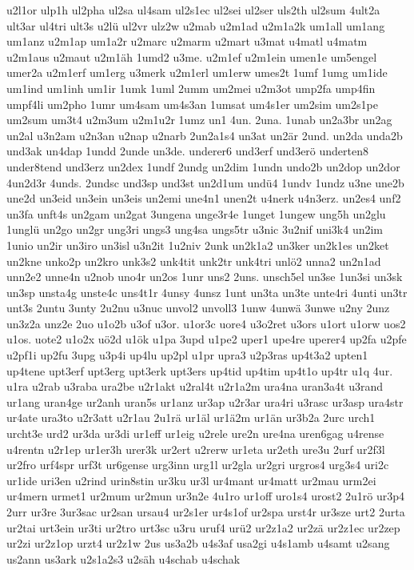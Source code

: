 {u2l1or
ulp1h
ul2pha
ul2sa
ul4sam
ul2s1ec
ul2sei
ul2ser
uls2th
ul2sum
4ult2a
ult3ar
ul4tri
ult3s
u2lü
ul2vr
ulz2w
u2mab
u2m1ad
u2m1a2k
um1all
um1ang
um1anz
u2m1ap
um1a2r
u2marc
u2marm
u2mart
u3mat
u4matl
u4matm
u2m1aus
u2maut
u2m1äh
1umd2
u3me.
u2m1ef
u2m1ein
umen1e
um5engel
umer2a
u2m1erf
um1erg
u3merk
u2m1erl
um1erw
umes2t
1umf
1umg
um1ide
um1ind
um1inh
um1ir
1umk
1uml
2umm
um2mei
u2m3ot
ump2fa
ump4fin
umpf4li
um2pho
1umr
um4sam
um4s3an
1umsat
um4s1er
um2sim
um2s1pe
um2sum
um3t4
u2m3um
u2m1u2r
1umz
un1
4un.
2una.
1unab
un2a3br
un2ag
un2al
u3n2am
u2n3an
u2nap
u2narb
2un2a1s4
un3at
un2är
2und.
un2da
unda2b
und3ak
un4dap
1undd
2unde
un3de.
underer6
und3erf
und3erö
underten8
under8tend
und3erz
un2dex
1undf
2undg
un2dim
1undn
undo2b
un2dop
un2dor
4un2d3r
4unds.
2undsc
und3sp
und3st
un2d1um
undü4
1undv
1undz
u3ne
une2b
une2d
un3eid
un3ein
un3eis
un2emi
une4n1
unen2t
u4nerk
u4n3erz.
un2es4
unf2
un3fa
unft4s
un2gam
un2gat
3ungena
unge3r4e
1unget
1ungew
ung5h
un2glu
1unglü
un2go
un2gr
ung3ri
ungs3
ung4sa
ungs5tr
u3nic
3u2nif
uni3k4
un2im
1unio
un2ir
un3iro
un3isl
u3n2it
1u2niv
2unk
un2k1a2
un3ker
un2k1es
un2ket
un2kne
unko2p
un2kro
unk3s2
unk4tit
unk2tr
unk4tri
unlö2
unna2
un2n1ad
unn2e2
unne4n
u2nob
uno4r
un2os
1unr
uns2
2uns.
unsch5el
un3se
1un3si
un3sk
un3sp
unsta4g
unste4c
uns4t1r
4unsy
4unsz
1unt
un3ta
un3te
unte4ri
4unti
un3tr
unt3s
2untu
3unty
2u2nu
u3nuc
unvol2
unvoll3
1unw
4unwä
3unwe
u2ny
2unz
un3z2a
unz2e
2uo
u1o2b
u3of
u3or.
u1or3c
uore4
u3o2ret
u3ors
u1ort
u1orw
uos2
u1os.
uote2
u1o2x
uö2d
u1ök
u1pa
3upd
u1pe2
uper1
upe4re
uperer4
up2fa
u2pfe
u2pf1i
up2fu
3upg
u3p4i
up4lu
up2pl
u1pr
upra3
u2p3ras
up4t3a2
upten1
up4tene
upt3erf
upt3erg
upt3erk
upt3ers
up4tid
up4tim
up4t1o
up4tr
u1q
4ur.
u1ra
u2rab
u3raba
ura2be
u2r1akt
u2ral4t
u2r1a2m
ura4na
uran3a4t
u3rand
ur1ang
uran4ge
ur2anh
uran5s
ur1anz
ur3ap
u2r3ar
ura4ri
u3rasc
ur3asp
ura4str
ur4ate
ura3to
u2r3att
u2r1au
2u1rä
ur1äl
ur1ä2m
ur1än
ur3b2a
2urc
urch1
urcht3e
urd2
ur3da
ur3di
ur1eff
ur1eig
u2rele
ure2n
ure4na
uren6gag
u4rense
u4rentn
u2r1ep
ur1er3h
urer3k
ur2ert
u2rerw
ur1eta
ur2eth
ure3u
2urf
ur2f3l
ur2fro
urf4spr
urf3t
ur6gense
urg3inn
urg1l
ur2gla
ur2gri
urgros4
urg3s4
uri2c
ur1ide
uri3en
u2rind
urin8stin
ur3ku
ur3l
ur4mant
ur4matt
ur2mau
urm2ei
ur4mern
urmet1
ur2mum
ur2mun
ur3n2e
4u1ro
ur1off
uro1s4
urost2
2u1rö
ur3p4
2urr
ur3re
3ur3sac
ur2san
ursau4
ur2s1er
ur4s1of
ur2spa
urst4r
ur3sze
urt2
2urta
ur2tai
urt3ein
ur3ti
ur2tro
urt3sc
u3ru
uruf4
urü2
ur2z1a2
ur2zä
ur2z1ec
ur2zep
ur2zi
ur2z1op
urzt4
ur2z1w
2us
us3a2b
u4s3af
usa2gi
u4s1amb
u4samt
u2sang
us2ann
us3ark
u2s1a2s3
u2säh
u4schab
u4schak
}
